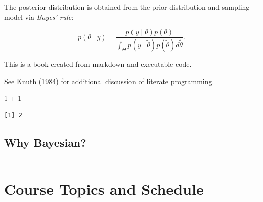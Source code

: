 \documentclass[
  letterpaper,
  DIV=11,
  numbers=noendperiod]{scrreprt}
\newenvironment{Shaded}{\begin{snugshade}}{\end{snugshade}}
\newcommand{\DecValTok}[1]{\textcolor[rgb]{0.68,0.00,0.00}{#1}}
\newcommand{\SpecialCharTok}[1]{\textcolor[rgb]{0.37,0.37,0.37}{#1}}
\begin{document}
The posterior distribution is obtained from the prior distribution and
sampling model via \emph{Bayes' rule}:

\[p(\theta \mid y)=\frac{p(y \mid \theta) p(\theta)}{\int_{\Theta} p(y \mid \tilde{\theta}) p(\tilde{\theta}) d \tilde{\theta}}.\]

This is a book created from markdown and executable code.

See Knuth (1984) for additional discussion of literate programming.

\begin{Shaded}
\begin{Highlighting}[]
\DecValTok{1} \SpecialCharTok{+} \DecValTok{1}
\end{Highlighting}
\end{Shaded}

\begin{verbatim}
[1] 2
\end{verbatim}

\section{Why Bayesian?}\label{why-bayesian}

\begin{center}\rule{0.5\linewidth}{0.5pt}\end{center}


\chapter{Course Topics and Schedule}\label{course-topics-and-schedule}
\end{document}
